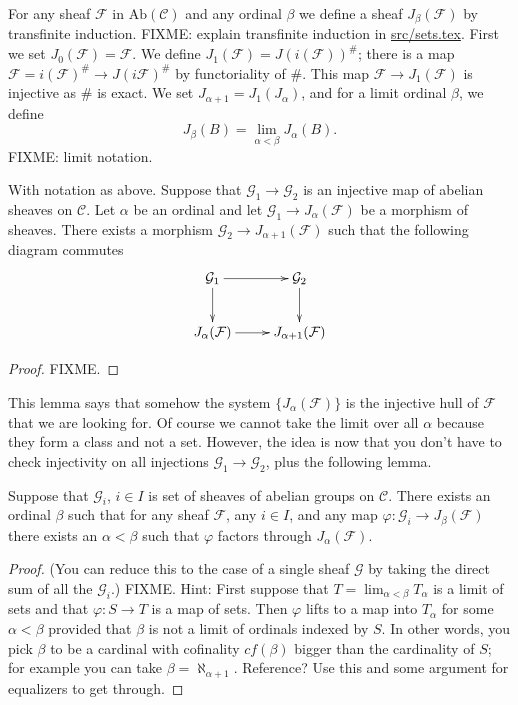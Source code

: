 \medskip\noindent
For any sheaf $\mathcal{F}$ in $\text{Ab}(\mathcal{C})$ and
any ordinal $\beta$ we define a sheaf
$J_\beta(\mathcal{F})$ by transfinite induction.
FIXME: explain transfinite induction in \url{src/sets.tex}.
First we set $J_0(\mathcal{F})=\mathcal{F}$.
We define $J_1(\mathcal{F})=J(i(\mathcal{F}))^\#$;
there is a map $\mathcal{F}=i(\mathcal{F})^\# \to J(i\mathcal{F})^\#$
by functoriality of $\#$. This map $\mathcal{F} \to J_1(\mathcal{F})$
is injective as $\#$ is exact. We set $J_{\alpha+1}=J_1(J_\alpha)$, 
and for a limit ordinal $\beta$, we define
$$
J_\beta(B) = \lim_{\alpha < \beta} J_\alpha(B).
$$
FIXME: limit notation.

\begin{lemma}
\label{lemma-map-into-next-one}
With notation as above.
Suppose that $\mathcal{G}_1 \to \mathcal{G}_2$ is an injective
map of abelian sheaves on $\mathcal{C}$. Let $\alpha$ be an ordinal
and let $\mathcal{G}_1\to J_\alpha(\mathcal{F})$ be a morphism
of sheaves. There exists a morphism $\mathcal{G}_2 \to
J_{\alpha+1}(\mathcal{F})$ such that the following diagram commutes
$$
\xymatrix{
\mathcal{G}_1 \ar[d] \ar[r] & \mathcal{G}_2 \ar[d] \\
J_{\alpha}(\mathcal{F}) \ar[r] & J_{\alpha+1}(\mathcal{F}) }
$$
\end{lemma}

\begin{proof}
FIXME.
\end{proof}

\noindent
This lemma says that somehow the system $\{J_{\alpha}(\mathcal{F})\}$
is the injective hull of $\mathcal{F}$ that we are looking for. Of course
we cannot take the limit over all $\alpha$ because they form a class
and not a set. However, the idea is now that you don't have to check
injectivity on all injections $\mathcal{G}_1 \to \mathcal{G}_2$, plus
the following lemma.

\begin{lemma}
\label{lemma-map-into-smaller}
Suppose that $\mathcal{G}_i$, $i\in I$ is set of sheaves of abelian 
groups on $\mathcal{C}$. There exists an ordinal $\beta$ such that
for any sheaf $\mathcal{F}$, any $i\in I$, and any map $\varphi : 
\mathcal{G}_i \to J_\beta(\mathcal{F})$ there exists an 
$\alpha < \beta$ such that $ \varphi $ factors through 
$J_\alpha(\mathcal{F})$.
\end{lemma}

\begin{proof}
(You can reduce this to the case of a single sheaf $\mathcal{G}$
by taking the direct sum of all the $\mathcal{G}_i$.)
FIXME. Hint: First suppose that $T = \lim_{\alpha < \beta} T_\alpha$
is a limit of sets and that $\varphi : S \to T$ is a map of sets. 
Then $\varphi$ lifts to a map into $T_\alpha$ for some $\alpha < \beta$
provided that $\beta$ is not a limit of ordinals indexed by $S$.
In other words, you pick $\beta$ to be a cardinal with cofinality
$cf(\beta)$ bigger than the cardinality of $S$; for example you can take 
$\beta = \aleph_{\alpha+1}$. Reference? Use this and
some argument for equalizers to get through.
\end{proof}

